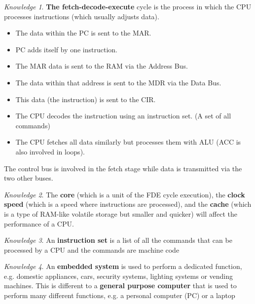 \documentclass[8pt]{article}
\theoremstyle{remark}
\newtheorem{knowledge}{Knowledge}[subsection]
\begin{document}
            \begin{knowledge}
                \textbf{The fetch-decode-execute} cycle is the process in which the CPU processes instructions (which usually adjusts data).

                \begin{itemize}
                    \item The data within the PC is sent to the MAR.
                    \item PC adds itself by one instruction.
                    \item The MAR data is sent to the RAM via the Address Bus.
                    \item The data within that address is sent to the MDR via the Data Bus.
                    \item This data (the instruction) is sent to the CIR.
                    \item The CPU decodes the instruction using an instruction set. (A set of all commands)
                    \item The CPU fetches all data similarly but processes them with ALU (ACC is also involved in loops).
                \end{itemize}

                The control bus is involved in the fetch stage while data is transmitted via the two other buses.
            \end{knowledge}

            \begin{knowledge}
                The \textbf{core} (which is a unit of the FDE cycle execution), the \textbf{clock speed} (which is a speed where instructions are processed), and the \textbf{cache} (which is a type of RAM-like volatile storage but smaller and quicker) will affect the performance of a CPU.
            \end{knowledge}

            \begin{knowledge}
                An \textbf{instruction set} is a list of all the commands that can be processed by a CPU and the commands are machine code
            \end{knowledge}

            \begin{knowledge}
                An \textbf{embedded system} is used to perform a dedicated function, e.g. domestic appliances, cars, security systems, lighting systems or vending machines. This is different to a \textbf{general purpose computer} that is used to perform many different functions, e.g. a personal computer (PC) or a laptop
            \end{knowledge}
\end{document}
